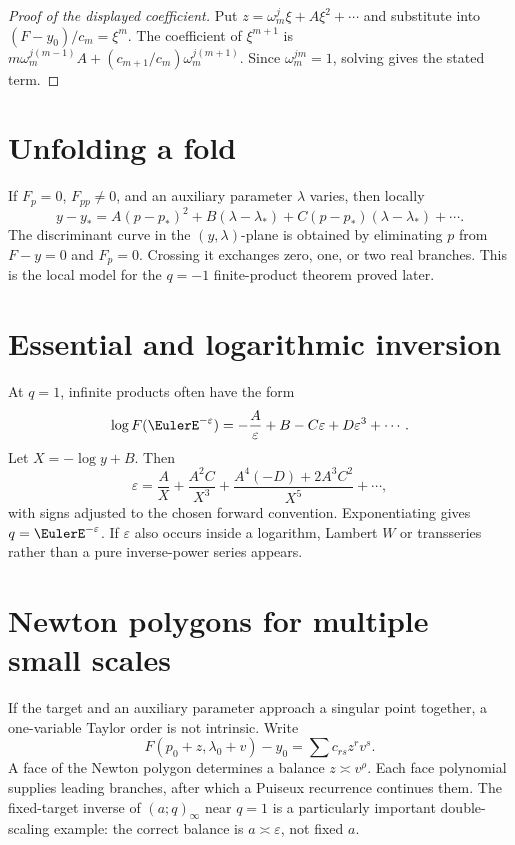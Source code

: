\documentclass[11pt,letterpaper,oneside,openany]{book}
\theoremstyle{definition}
\theoremstyle{remark}
\begin{document}
\begin{proof}[Proof of the displayed coefficient]
Put \(z=\omega_m^j\xi+A\xi^2+\cdots\) and substitute into
\((F-y_0)/c_m=\xi^m\).  The coefficient of \(\xi^{m+1}\) is
\(m\omega_m^{j(m-1)}A+(c_{m+1}/c_m)\omega_m^{j(m+1)}\).  Since
\(\omega_m^{jm}=1\), solving gives the stated term.
\end{proof}

\section{Unfolding a fold}
If \(F_p=0\), \(F_{pp}\ne0\), and an auxiliary parameter \(\lambda\) varies,
then locally
\[
 y-y_*=A(p-p_*)^2+B(\lambda-\lambda_*)+
 C(p-p_*)(\lambda-\lambda_*)+\cdots.
\]
The discriminant curve in the \((y,\lambda)\)-plane is obtained by eliminating
\(p\) from \(F-y=0\) and \(F_p=0\).  Crossing it exchanges zero, one, or two
real branches.  This is the local model for the \(q=-1\) finite-product theorem
proved later.

\section{Essential and logarithmic inversion}
At \(q=1\), infinite products often have the form
\[
 \log F(\EulerE^{-\varepsilon})=-\frac{A}{\varepsilon}+B-C\varepsilon+
 D\varepsilon^3+\cdots.
\]
Let \(X=-\log y+B\).  Then
\begin{equation}
 \varepsilon=
 \frac{A}{X}+\frac{A^2C}{X^3}
 +\frac{A^4(-D)+2A^3C^2}{X^5}+\cdots,
 \label{eq:essential-reversion-template}
\end{equation}
with signs adjusted to the chosen forward convention.  Exponentiating gives
\(q=\EulerE^{-\varepsilon}\).  If \(\varepsilon\) also occurs inside a logarithm,
Lambert \(W\) or transseries rather than a pure inverse-power series appears.

\section{Newton polygons for multiple small scales}
If the target and an auxiliary parameter approach a singular point together,
a one-variable Taylor order is not intrinsic.  Write
\[
 F(p_0+z,\lambda_0+v)-y_0
 =\sum c_{rs}z^rv^s.
\]
A face of the Newton polygon determines a balance \(z\asymp v^\rho\).  Each
face polynomial supplies leading branches, after which a Puiseux recurrence
continues them.  The fixed-target inverse of \((a;q)_\infty\) near \(q=1\) is a
particularly important double-scaling example: the correct balance is
\(a\asymp\varepsilon\), not fixed \(a\).
\end{document}
